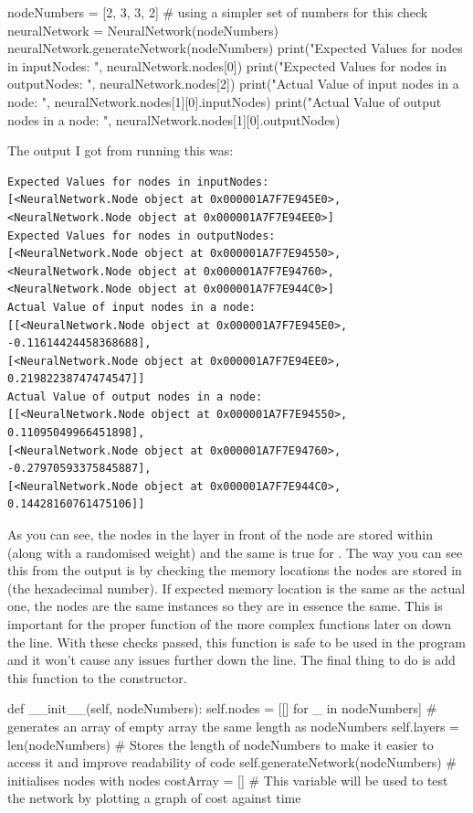 \documentclass{report}
\begin{document}
\newpage
\begin{python}
nodeNumbers = [2, 3, 3, 2] # using a simpler set of numbers for this check
neuralNetwork = NeuralNetwork(nodeNumbers)
neuralNetwork.generateNetwork(nodeNumbers)
print("Expected Values for nodes in inputNodes: \n", neuralNetwork.nodes[0])
print("Expected Values for nodes in outputNodes: \n", neuralNetwork.nodes[2])
print("Actual Value of input nodes in a node: \n", neuralNetwork.nodes[1][0].inputNodes)
print("Actual Value of output nodes in a node: \n", neuralNetwork.nodes[1][0].outputNodes)
\end{python}
The output I got from running this was:
\begin{verbatim}
Expected Values for nodes in inputNodes:
[<NeuralNetwork.Node object at 0x000001A7F7E945E0>,
<NeuralNetwork.Node object at 0x000001A7F7E94EE0>]
Expected Values for nodes in outputNodes:
[<NeuralNetwork.Node object at 0x000001A7F7E94550>,
<NeuralNetwork.Node object at 0x000001A7F7E94760>,
<NeuralNetwork.Node object at 0x000001A7F7E944C0>]
Actual Value of input nodes in a node:
[[<NeuralNetwork.Node object at 0x000001A7F7E945E0>, -0.11614424458368688],
[<NeuralNetwork.Node object at 0x000001A7F7E94EE0>, 0.21982238747474547]]
Actual Value of output nodes in a node:
[[<NeuralNetwork.Node object at 0x000001A7F7E94550>, 0.11095049966451898],
[<NeuralNetwork.Node object at 0x000001A7F7E94760>, -0.27970593375845887],
[<NeuralNetwork.Node object at 0x000001A7F7E944C0>, 0.14428160761475106]]
\end{verbatim}
As you can see, the nodes in the layer in front of the node are stored within  (along with a randomised weight) and the same is true for . The way you can see this from the output is by checking the memory locations the nodes are stored in (the hexadecimal number). If expected memory location is the same as the actual one, the nodes are the same instances so they are in essence the same. This is important for the proper function of the more complex functions later on down the line.
\newline
With these checks passed, this function is safe to be used in the program and it won't cause any issues further down the line. The final thing to do is add this function to the  constructor.
\begin{python}
def __init__(self, nodeNumbers):
    self.nodes = [[] for _ in nodeNumbers] # generates an array of empty array the same length as nodeNumbers
    self.layers = len(nodeNumbers) # Stores the length of nodeNumbers to make it easier to access it and improve readability of code
    self.generateNetwork(nodeNumbers) # initialises nodes with nodes
    costArray = [] # This variable will be used to test the network by plotting a graph of cost against time
\end{python}
\newpage
\end{document}
